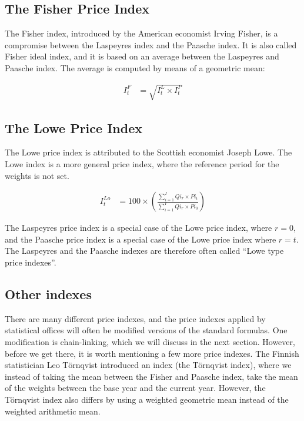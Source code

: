 \documentclass[
]{book}
\begin{document}
\hypertarget{the-fisher-price-index}{%
\subsection{The Fisher Price Index}\label{the-fisher-price-index}}

The Fisher index, introduced by the American economist Irving Fisher, is a compromise between the Laspeyres index and the Paasche index. It is also called Fisher ideal index, and it is based on an average between the Laspeyres and Paasche index. The average is computed by means of a geometric mean:

\begin{align}
      I_t^F&=\sqrt{I^ L_t\times I^ P_t} 
    \label{eq11}
\end{align}

\hypertarget{the-lowe-price-index}{%
\subsection{The Lowe Price Index}\label{the-lowe-price-index}}

The Lowe price index is attributed to the Scottish economist Joseph Lowe. The Lowe index is a more general price index, where the reference period for the weights is not set.

\begin{align}
   I_t^{Lo}&=100\times \left(\frac{\sum^I_{i=1} Qi_r \times Pi_t}{\sum^I_{i=1}Qi_r \times Pi_0}\right)
    \label{eq12}
\end{align}

The Laspeyres price index is a special case of the Lowe price index, where \(r=0\), and the Paasche price index is a special case of the Lowe price index where \(r=t\). The Laspeyres and the Paasche indexes are therefore often called ``Lowe type price indexes''.

\hypertarget{other-indexes}{%
\subsection*{Other indexes}\label{other-indexes}}

There are many different price indexes, and the price indexes applied by statistical offices will often be modified versions of the standard formulas. One modification is chain-linking, which we will discuss in the next section. However, before we get there, it is worth mentioning a few more price indexes. The Finnish statistician Leo Törnqvist introduced an index (the Törnqvist index), where we instead of taking the mean between the Fisher and Paasche index, take the mean of the weights between the base year and the current year. However, the Törnqvist index also differs by using a weighted geometric mean instead of the weighted arithmetic mean.
\end{document}
